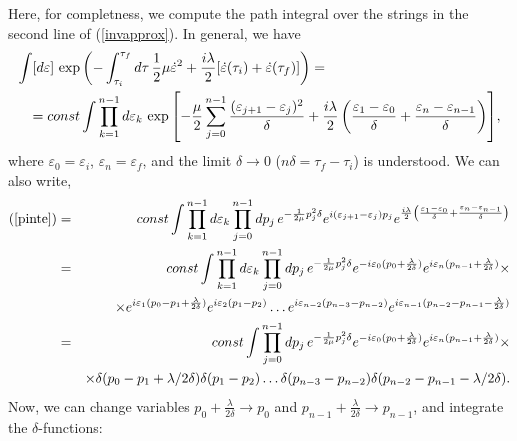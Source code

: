 \documentclass[a4paper,12pt]{article}
\begin{document}
Here, for completness, we compute the path integral over the strings in the second line of (\ref{invapprox}). In general, we have
\begin{eqnarray}
\lefteqn{\int [d\varepsilon]\, \exp {\left( -\int_{\tau_i}^{\tau_f} d\tau\, 
\frac{1}{2}\mu \dot{\varepsilon}^2+ \frac{i\lambda}{2}[\dot{\varepsilon}(\tau_i)+\dot{\varepsilon}(\tau_f)]\right)}=}\nonumber \\ 
&&=const \int \prod_{k=1}^{n-1}d\varepsilon_k\, \exp{\left[-\frac{\mu}{2} \sum_{j=0}^{n-1}\frac{(\varepsilon_{j+1}-\varepsilon_j)^2}{\delta}+\frac{i\lambda}{2}\left(\frac{\varepsilon_1-\varepsilon_0}{\delta}+\frac{\varepsilon_n-\varepsilon_{n-1}}{\delta}\right)\right]},\nonumber \\
\label{pinte}
\end{eqnarray}
where $\varepsilon_0=\varepsilon_i$, $\varepsilon_n=\varepsilon_f$, and the limit $\delta\to 0$ 
($ n\delta=\tau_f-\tau_i$) is understood. We can also write,
\begin{eqnarray}
(\ref{pinte})&=&const \int \prod_{k=1}^{n-1}d\varepsilon_k \prod_{j=0}^{n-1}dp_j\, e^{-\frac{1}{2\mu}p_j^2\delta}
e^{i(\varepsilon_{j+1}-\varepsilon_j)p_j} 
e^{\frac{i\lambda}{2}\left(\frac{\varepsilon_1-\varepsilon_0}{\delta}+\frac{\varepsilon_n-\varepsilon_{n-1}}{\delta}\right)}\nonumber \\
&=&const \int \prod_{k=1}^{n-1}d\varepsilon_k \prod_{j=0}^{n-1}dp_j\, e^{-\frac{1}{2\mu}p_j^2\delta}
e^{-i\varepsilon_0(p_0+\frac{\lambda}{2\delta})}e^{i\varepsilon_n(p_{n-1}+\frac{\lambda}{2\delta})}\times \nonumber \\
&&\times e^{i\varepsilon_1(p_0-p_1+\frac{\lambda}{2\delta})}e^{i\varepsilon_2(p_1-p_2)}\dots
e^{i\varepsilon_{n-2}(p_{n-3}-p_{n-2})}e^{i\varepsilon_{n-1}(p_{n-2}-p_{n-1}-\frac{\lambda}{2\delta})}
\nonumber \\
&=&const \int \prod_{j=0}^{n-1}dp_j\, e^{-\frac{1}{2\mu}p_j^2\delta}
e^{-i\varepsilon_0(p_0+\frac{\lambda}{2\delta})}e^{i\varepsilon_n(p_{n-1}+\frac{\lambda}{2\delta})}\times \nonumber \\
&&\times \delta(p_0-p_1+\lambda/2\delta)\delta(p_1-p_2)\dots
\delta(p_{n-3}-p_{n-2})\delta(p_{n-2}-p_{n-1}-\lambda/2\delta).\nonumber
\end{eqnarray}
Now, we can change variables $p_0+\frac{\lambda}{2\delta}\to p_0$ and $p_{n-1}+\frac{\lambda}{2\delta}\to 
p_{n-1}$, and integrate the $\delta$-functions:
\end{document}
